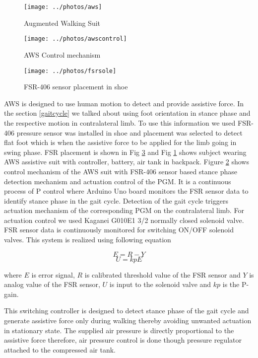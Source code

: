 \documentclass[letterpaper, 10 pt, conference]{ieeeconf}  %
\begin{document}
\begin{figure}
	\centering
	\texttt{[image: ../photos/aws]}
	\caption{Augmented Walking Suit}
	\label{fig:aws}
\end{figure}


\begin{figure}
	\centering
	\texttt{[image: ../photos/awscontrol]}
	\caption{AWS Control mechanism}
	\label{fig:awssystem}
\end{figure}
\begin{figure}
	\centering
	\texttt{[image: ../photos/fsrsole]}
	\caption{FSR-406 sensor placement in shoe}
	\label{fig:fsrsole}
\end{figure}


AWS is designed to use human motion to detect and provide assistive force. In the section \ref{gaitcycle} we talked about using foot orientation in stance phase and the respective motion in contralateral limb. To use this information we used FSR-406 pressure sensor was installed in shoe and placement was selected to detect flat foot which is when the assistive force to be applied for the limb going in swing phase. FSR placement is shown in Fig \ref{fig:fsrsole} and Fig \ref {fig:aws} shows subject wearing AWS assistive suit with controller, battery, air tank in backpack. Figure \ref{fig:awssystem} shows control mechanism of the AWS suit with FSR-406 sensor based stance phase detection mechanism and actuation control of the PGM. It is a continuous process of P control where Arduino Uno board monitors the FSR sensor data to identify stance phase in the gait cycle. Detection of the gait cycle triggers actuation mechanism of the corresponding PGM on the contralateral limb. For actuation control we used Kaganei G010E1 3/2 normally closed solenoid valve. FSR sensor data is continuously monitored for switching ON/OFF solenoid valves. This system is realized using following equation 

\begin{equation}\label{kevalue}
E = R - Y 
\end{equation}
\begin{equation}\label{uvalue}
U = kpE
\end{equation}

where $E$ is error signal, $R$ is calibrated threshold value of the FSR sensor and $Y$ is analog value of the FSR sensor, $U$ is input to the solenoid valve and $kp$ is the P-gain. 

This switching controller is designed to detect stance phase of the gait cycle and generate assistive force only during walking thereby avoiding unwanted actuation in stationary state. The supplied air pressure is directly proportional to the assistive force therefore, air pressure control is done though pressure regulator attached to the compressed air tank.
\end{document}
